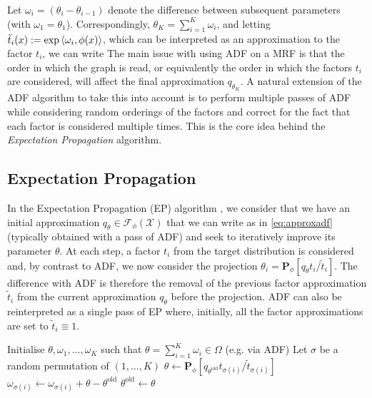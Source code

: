 Let $\omega_{i}=(\theta_{i}-\theta_{i-1})$ denote the difference between subsequent parameters (with $\omega_{1}=\theta_{1}$). Correspondingly, $\theta_{K}=\sum_{i=1}^{K}\omega_{i}$, and letting $\tilde t_{i}(x):=\exp\left\langle \omega_{i},\phi(x) \right\rangle$, which can be interpreted as an approximation to the factor $t_{i}$, we can write 
%
% 
The main issue with using ADF on a MRF is that the order in which the graph is read, or equivalently the order in which the factors $t_{i}$ are considered, will affect the final approximation $q_{\theta_{K}}$. A natural extension of the ADF algorithm to take this into account is to perform multiple passes of ADF while considering random orderings of the factors and correct for the fact that each factor is considered multiple times. This is the core idea behind the \emph{Expectation Propagation} algorithm.
%
\subsection{\label{point:EP}Expectation Propagation}
%
In the Expectation Propagation (EP) algorithm \citep{minka01, minka01b, seeger07, gelman14}, we consider that we have an initial approximation $q_{\theta}\in\mathcal F_{\phi}(\mathcal X)$ that we can write as in \eqref{eq:approxadf} (typically obtained with a pass of ADF) and seek to iteratively improve its parameter $\theta$. At each step, a factor $t_{i}$ from the target distribution is considered and, by contrast to ADF, we now consider the projection $\theta_{i}=\mathbf P_{\phi}[q_{\theta}t_{i}/\tilde t_{i}]$. The difference with ADF is therefore the removal of the previous factor approximation $\tilde t_{i}$ from the current approximation $q_{\theta}$ before the projection. ADF can also be reinterpreted as a single pass of EP where, initially, all the factor approximations are set to $\tilde t_{i}\equiv 1$.

\begin{algorithm}[!h]\small
	\caption{\label{alg:ep}}
	\begin{algorithmic}[1]
	\State Initialise $\theta,\omega_{1},\dots,\omega_{K}$ such that $\theta=\sum_{i=1}^{K}\omega_{i} \in \Omega$ (e.g. via ADF)
		\State Let $\sigma$ be a random permutation of $(1,\dots,K)$
    		\State $\theta \leftarrow \mathbf P_{\phi}[q_{\theta^{\text{old}}}t_{\sigma(i)}/\tilde t_{\sigma(i)}]$
    		\State $\omega_{\sigma(i)} \leftarrow \omega_{\sigma(i)} + \theta-\theta^{\text{old}}$
			\State $\theta^{\text{old}} \leftarrow \theta$
		\EndFor
	\EndFor\\	
	\Return{$\theta$}
	\end{algorithmic}
\end{algorithm} 

